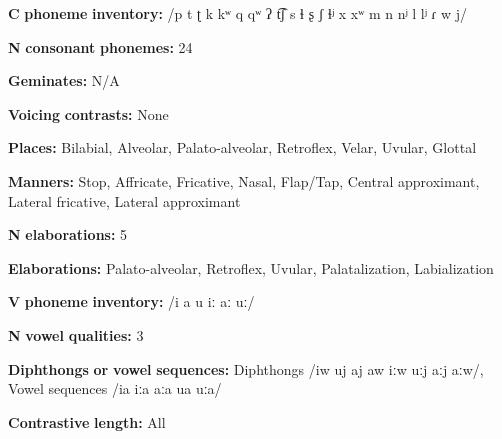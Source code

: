 \begin{styleBody}
\textbf{C} \textbf{phoneme} \textbf{inventory:} /p t ʈ k kʷ q qʷ ʔ t͡ʃ s ɬ ʂ ʃ ɬʲ x xʷ m n nʲ l lʲ ɾ w j/
\end{styleBody}

\begin{styleBody}
\textbf{N} \textbf{consonant} \textbf{phonemes:} 24
\end{styleBody}

\begin{styleBody}
\textbf{Geminates:} N/A
\end{styleBody}

\begin{styleBody}
\textbf{Voicing} \textbf{contrasts:} None
\end{styleBody}

\begin{styleBody}
\textbf{Places:} Bilabial, Alveolar, Palato-alveolar, Retroflex, Velar, Uvular, Glottal
\end{styleBody}

\begin{styleBody}
\textbf{Manners:} Stop, Affricate, Fricative, Nasal, Flap/Tap, Central approximant, Lateral fricative, Lateral approximant
\end{styleBody}

\begin{styleBody}
\textbf{N} \textbf{elaborations:} 5
\end{styleBody}

\begin{styleBody}
\textbf{Elaborations:} Palato-alveolar, Retroflex, Uvular, Palatalization, Labialization
\end{styleBody}

\begin{styleBody}
\textbf{V} \textbf{phoneme} \textbf{inventory:} /i a u iː aː uː/
\end{styleBody}

\begin{styleBody}
\textbf{N} \textbf{vowel} \textbf{qualities:} 3
\end{styleBody}

\begin{styleBody}
\textbf{Diphthongs} \textbf{or} \textbf{vowel} \textbf{sequences:} Diphthongs /iw uj aj aw iːw uːj aːj aːw/, Vowel sequences /ia iːa aːa ua uːa/
\end{styleBody}

\begin{styleBody}
\textbf{Contrastive} \textbf{length:} All
\end{styleBody}

